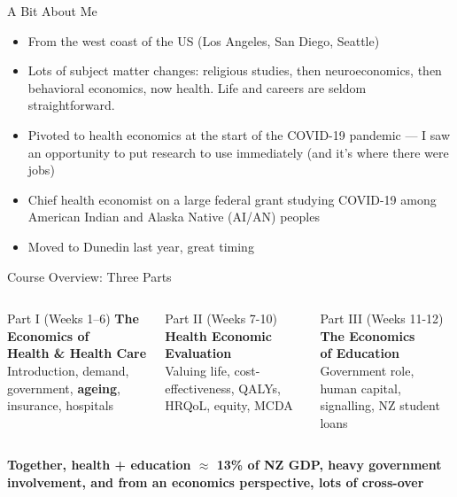 \documentclass[aspectratio=169, 12pt]{beamer}
\begin{document}
\begin{frame}{A Bit About Me}
  \begin{itemize}
    \item From the west coast of the US (Los Angeles, San Diego, Seattle)
    \item Lots of subject matter changes: religious studies, then neuroeconomics, then behavioral economics, now health. Life and careers are seldom straightforward.
    \item Pivoted to health economics at the start of the COVID-19 pandemic --- I saw an opportunity
          to put research to use immediately (and it's where there were jobs)
    \item Chief health economist on a large federal grant studying COVID-19 among American Indian
          and Alaska Native (AI/AN) peoples
    \item Moved to Dunedin last year, great timing
  \end{itemize}
\end{frame}

\begin{frame}{Course Overview: Three Parts}
  \begin{columns}
      \begin{block}{Part I (Weeks 1--6)}
        \textbf{The Economics of\\Health \& Health Care}\\[0.4em]
        {\small Introduction, demand, government, \textbf{ageing}, insurance, hospitals}
      \end{block}
      \begin{block}{Part II (Weeks 7-10)}
        \textbf{Health Economic\\Evaluation}\\[0.4em]
        {\small Valuing life, cost-effectiveness, QALYs, HRQoL, equity, MCDA}
      \end{block}
      \begin{block}{Part III (Weeks 11-12)}
        \textbf{The Economics\\of Education}\\[0.4em]
        {\small Government role, human capital, signalling, NZ student loans}
      \end{block}
  \end{columns}
  \vspace{0.6em}
  \begin{center}
    \textbf{Together, health + education $\approx$ 13\% of NZ GDP, heavy government involvement, and from an economics perspective, lots of cross-over}
  \end{center}
\end{frame}
\end{document}

